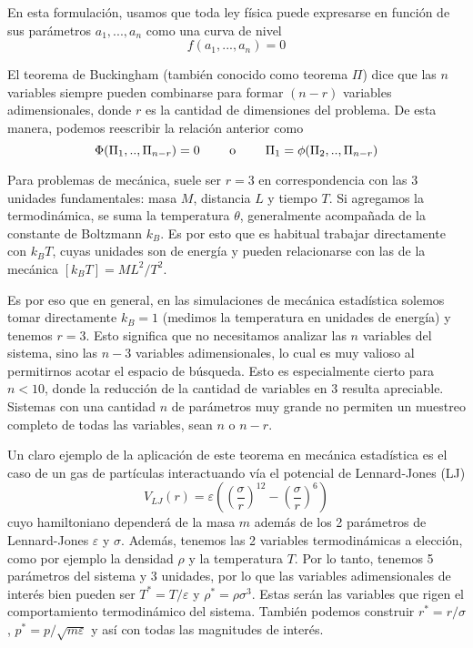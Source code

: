 En esta formulación, usamos que toda ley física puede expresarse en función de sus parámetros $a_1,...,a_n$ como una curva de nivel
\[ f(a_1,...,a_n) = 0 \]

El teorema de Buckingham\cite[pp. 21-22]{BOOK:KUNDU} (también conocido como teorema $\Pi$) dice que las $n$ variables siempre pueden combinarse para formar 
$(n-r)$ variables adimensionales, donde $r$ es la cantidad de dimensiones del problema. 
De esta manera, podemos reescribir la relación anterior como
\begin{equation}{\label{eq:teo_pi}}
\Phi(\Pi_1,..,\Pi_{n-r}) = 0 \qquad \text{ o } \qquad \Pi_1=\phi(\Pi_2,..,\Pi_{n-r})
\end{equation}

Para problemas de mecánica, suele ser $r=3$ en correspondencia con las 3 unidades fundamentales: masa $M$, distancia $L$ y tiempo $T$.
Si agregamos la termodinámica, se suma la temperatura $\theta$, generalmente acompañada de la constante de Boltzmann $k_B$.
Es por esto que es habitual trabajar directamente con $k_BT$, cuyas unidades son de energía y pueden relacionarse con las de la mecánica $[k_BT] = ML^2/T^2$.

Es por eso que en general, en las simulaciones de mecánica estadística solemos tomar directamente $k_B=1$ (medimos la temperatura en unidades de energía) y tenemos $r=3$.
Esto significa que no necesitamos analizar las $n$ variables del sistema, sino las $n-3$ variables adimensionales, lo cual es muy valioso al permitirnos acotar el espacio de búsqueda.
Esto es especialmente cierto para $n<10$, donde la reducción de la cantidad de variables en 3 resulta apreciable.
Sistemas con una cantidad $n$ de parámetros muy grande no permiten un muestreo completo de todas las variables, sean $n$ o $n-r$.

Un claro ejemplo de la aplicación de este teorema en mecánica estadística es el caso de un gas de partículas interactuando vía el potencial de Lennard-Jones (LJ)
\[ V_{LJ}(r) = \varepsilon\left( \left( \frac{\sigma}{r} \right)^{12} - \left( \frac{\sigma}{r} \right)^6 \right) \]
cuyo hamiltoniano dependerá de la masa $m$ además de los 2 parámetros de Lennard-Jones $\varepsilon$ y $\sigma$.
Además, tenemos las 2 variables termodinámicas a elección, como por ejemplo la densidad $\rho$ y la temperatura $T$.
Por lo tanto, tenemos 5 parámetros del sistema y 3 unidades, por lo que las variables adimensionales de interés bien pueden ser $T^* = T/\varepsilon$ y $\rho^*=\rho\sigma^3$. 
Estas serán las variables que rigen el comportamiento termodinámico del sistema.
También podemos construir $r^*=r/\sigma$, $p^*=p/\sqrt{m\varepsilon}$ y así con todas las magnitudes de interés.

